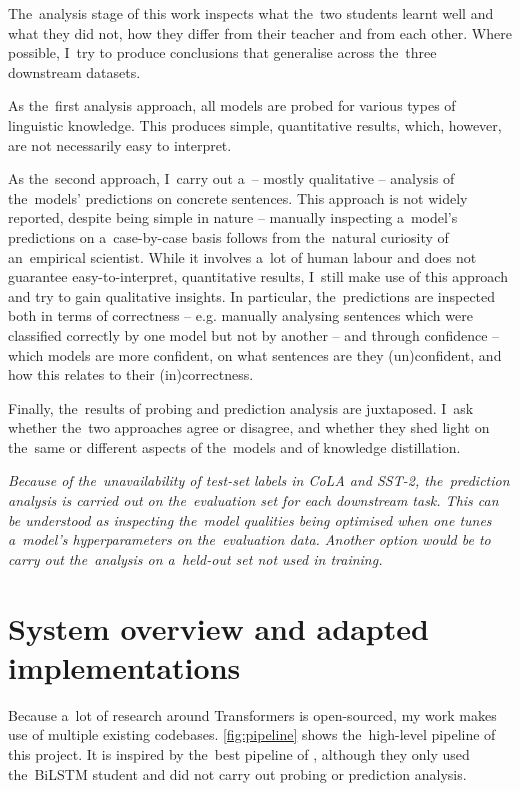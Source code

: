 \documentclass[bsc,frontabs,singlespacing,parskip,deptreport]{infthesis}
\begin{document}
{{    %
    The~analysis stage of this work inspects what the~two students learnt well and what they did not, how they differ from their teacher and from each other. 
    Where possible, I~try to produce conclusions that generalise across the~three downstream datasets.

    As the~first analysis approach, all models are probed for various types of linguistic knowledge. This produces simple, quantitative results, which, however, are not necessarily easy to interpret.

    As the~second approach, I~carry out a~-- mostly qualitative -- analysis of the~models' predictions on concrete sentences. 
    This approach is not widely reported, despite being simple in nature -- manually inspecting a~model's predictions on a~case-by-case basis follows from the~natural curiosity of an~empirical scientist.
    While it involves a~lot of human labour and does not guarantee easy-to-interpret, quantitative results, I~still make use of this approach and try to gain qualitative insights.
    In particular, the~predictions are inspected both in terms of correctness -- e.g. manually analysing sentences which were classified correctly by one model but not by another -- and through confidence -- which models are more confident, on what sentences are they (un)confident, and how this relates to their (in)correctness.

    Finally, the~results of probing and prediction analysis are juxtaposed. I~ask whether the~two approaches agree or disagree, and whether they shed light on the~same or different aspects of the~models and of knowledge distillation.

    \textit{Because of the~unavailability of test-set labels in CoLA and SST-2, the~prediction analysis is carried out on the~evaluation set for each downstream task. This can be understood as inspecting the~model qualities being optimised when one tunes a~model's hyperparameters on the~evaluation data. Another option would be to carry out the~analysis on a~held-out set not used in training.}
  }

  \section{System overview and adapted implementations}{
    Because a~lot of research around Transformers is open-sourced, my work makes use of multiple existing codebases. \autoref{fig:pipeline} shows the~high-level pipeline of this project. It is inspired by the~best pipeline of \citet{Tang_2019b}, although they only used the~BiLSTM student and did not carry out probing or prediction analysis.
  
}}
\end{document}
